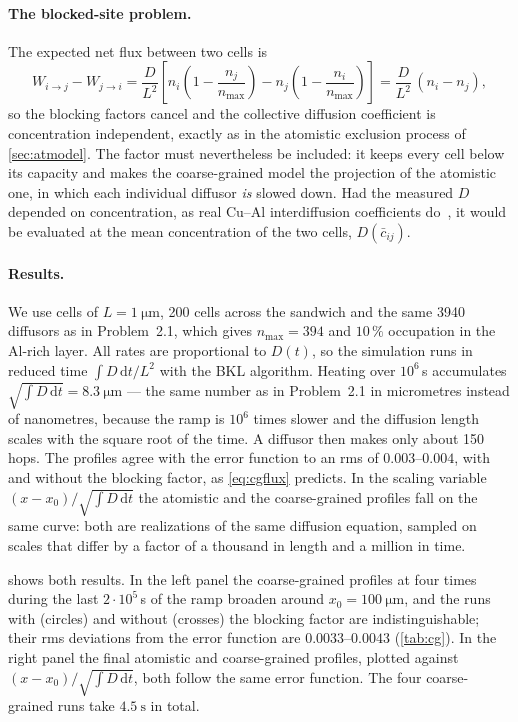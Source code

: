 \documentclass[11pt,a4paper]{article}
\numberwithin{equation}{section}
\theoremstyle{remark}
\begin{document}
\paragraph{The blocked-site problem.}
The expected net flux between two cells is
\begin{equation}\label{eq:cgflux}
  W_{i\to j} - W_{j\to i}
  = \frac{D}{L^2}\left[n_i\left(1 - \frac{n_j}{n_{\max}}\right) - n_j\left(1 - \frac{n_i}{n_{\max}}\right)\right]
  = \frac{D}{L^2}\,(n_i - n_j),
\end{equation}
so the blocking factors cancel and the collective diffusion coefficient is concentration independent,
exactly as in the atomistic exclusion process of \cref{sec:atmodel}. The factor must nevertheless be
included: it keeps every cell below its capacity and makes the coarse-grained model the projection of
the atomistic one, in which each individual diffusor \emph{is} slowed down. Had the measured $D$
depended on concentration, as real Cu--Al interdiffusion coefficients do~\citep{laik2008}, it would be
evaluated at the mean concentration of the two cells, $D(\bar c_{ij})$.

\paragraph{Results.}
We use cells of $L = \SI{1}{\micro\metre}$, 200 cells across the sandwich and the same 3940 diffusors
as in Problem~2.1, which gives $n_{\max} = 394$ and $10\,\%$ occupation in the Al-rich layer. All rates
are proportional to $D(t)$, so the simulation runs in reduced time $\int D\,\mathrm{d}t/L^2$ with the
BKL algorithm. Heating over $10^6$\,s accumulates $\sqrt{\int D\,\mathrm{d}t} = \SI{8.3}{\micro\metre}$
--- the same number as in Problem~2.1 in micrometres instead of nanometres, because the ramp is
$10^6$ times slower and the diffusion length scales with the square root of the time. A diffusor then
makes only about 150 hops. The profiles agree with the error function to an rms of
$0.003$--$0.004$, with and without the blocking factor, as \cref{eq:cgflux} predicts. In the scaling
variable $(x-x_0)/\sqrt{\int D\,\mathrm{d}t}$ the atomistic and the coarse-grained profiles fall on the
same curve: both are realizations of the same diffusion equation, sampled on scales that differ by a
factor of a thousand in length and a million in time.

 shows both results. In the left panel the coarse-grained profiles at four times
during the last $2\cdot10^{5}$\,s of the ramp broaden around $x_0 = \SI{100}{\micro\metre}$, and the runs
with (circles) and without (crosses) the blocking factor are indistinguishable; their rms deviations
from the error function are $0.0033$--$0.0043$ (\cref{tab:cg}). In the right panel the final atomistic
and coarse-grained profiles, plotted against $(x-x_0)/\sqrt{\int D\,\mathrm{d}t}$, both follow the same
error function. The four coarse-grained runs take $\SI{4.5}{\second}$ in total.
\end{document}
